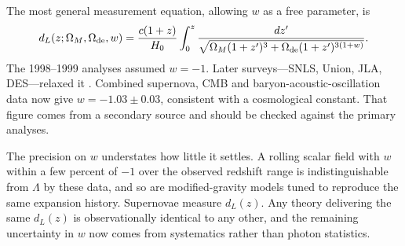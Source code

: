 \documentclass[12pt]{article}
\begin{document}
The most general measurement equation, allowing $w$ as a free parameter, is
\begin{equation}\label{eq:mu_w}
  d_L(z;\Omega_M,\Omega_{\rm de},w) = \frac{c(1+z)}{H_0}
  \int_0^z \frac{dz'}{\sqrt{\Omega_M(1+z')^3
    + \Omega_{\rm de}(1+z')^{3(1+w)}}}.
\end{equation}
The 1998--1999 analyses assumed $w = -1$.  Later surveys---SNLS, Union, JLA,
DES---relaxed it \citep{Conley2011,Sullivan2011}.  Combined supernova, CMB and
baryon-acoustic-oscillation data now give $w = -1.03 \pm 0.03$, consistent
with a cosmological constant.  That figure comes from a secondary source and
should be checked against the primary analyses.

The precision on $w$ understates how little it settles.  A rolling scalar
field with $w$ within a few percent of $-1$ over the observed redshift range
is indistinguishable from $\Lambda$ by these data, and so are modified-gravity
models tuned to reproduce the same expansion history.  Supernovae measure
$d_L(z)$.  Any theory delivering the same $d_L(z)$ is observationally
identical to any other, and the remaining uncertainty in $w$ now comes from
systematics rather than photon statistics.

\bigskip


\end{document}
